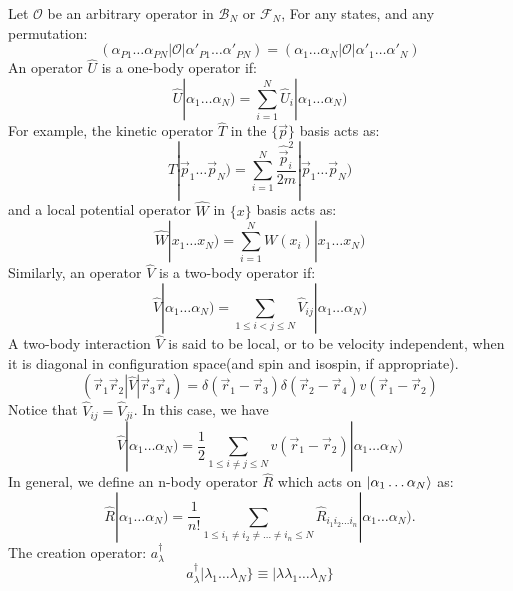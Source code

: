 \documentclass[12pt]{article}
\begin{document}
Let $\mathcal{O}$ be an arbitrary operator in $\mathcal{B}_N$ or $\mathcal{F}_N$, 
For any states, and any permutation:
\begin{equation*}
    (\alpha_{P1}\dots\alpha_{PN}|\mathcal{O}|\alpha'_{P1}\dots\alpha'_{PN})
    =(\alpha_1\dots\alpha_N|\mathcal{O}|\alpha'_1\dots\alpha'_N)
\end{equation*}
An operator $\hat{U}$ is a one-body operator if:
\begin{equation*}
    \hat{U}|\alpha_1\dots\alpha_N)=\sum_{i=1}^{N}\hat{U}_i|\alpha_1\dots\alpha_N)
\end{equation*}
For example, the kinetic operator $\hat{T}$ in the $\{\vec{p}\}$ basis acts as:
\begin{equation*}
    \hat{T}|\vec{p}_1\dots\vec{p}_N)=\sum_{i=1}^{N}\frac{\hat{\vec{p}}^2_i}{2m}
    |\vec{p}_1\dots\vec{p}_N)
\end{equation*}
and a local potential operator $\hat{W}$ in $\{x\}$ basis acts as:
\begin{equation*}
    \hat{W}|x_1\dots x_N)=\sum_{i=1}^NW(x_i)|x_1\dots x_N)
\end{equation*}
Similarly, an operator $\hat{V}$ is a two-body operator if:
\begin{equation*}
    \hat{V}|\alpha_1\dots \alpha_N)=\sum_{1\leq i<j\leq N}\hat{V}_{ij}
    |\alpha_1\dots \alpha_N)
\end{equation*}
A two-body interaction $\hat{V}$ is said to be local, or to be velocity independent, 
when it is diagonal in configuration space(and spin and isospin, if appropriate).
\begin{equation*}
    (\vec{r}_1\vec{r}_2|\hat{V}|\vec{r}_3\vec{r}_4)=\delta(\vec{r}_1-\vec{r}_3)
    \delta(\vec{r}_2-\vec{r}_4)v(\vec{r}_1-\vec{r}_2)
\end{equation*}
Notice that $\hat{V}_{ij}=\hat{V}_{ji}$. In this case, we have
\begin{equation*}
    \hat{V}|\alpha_1\dots \alpha_N)=\frac{1}{2}\sum_{1\le i\neq j\le N}
    v(\vec{r}_1-\vec{r}_2)|\alpha_1\dots \alpha_N)
\end{equation*}
In general, we define an n-body operator $\hat{R}$ which acts on 
$\ket{\alpha_1\dots\alpha_N}$ as:
\begin{equation*}
    \hat{R}|\alpha_1\dots\alpha_N)=\frac{1}{n!}\sum_{1\leq i_1\neq i_2\neq\dots
    \neq i_n\leq N}\hat{R}_{i_1i_2... i_n}|\alpha_1\dots\alpha_N).
\end{equation*} 
The creation operator: $a^\dagger_\lambda$
\begin{equation*}
    a^\dagger_\lambda|\lambda_1\dots\lambda_N\}\equiv|\lambda\lambda_1\dots\lambda_N\}
\end{equation*}
\end{document}
